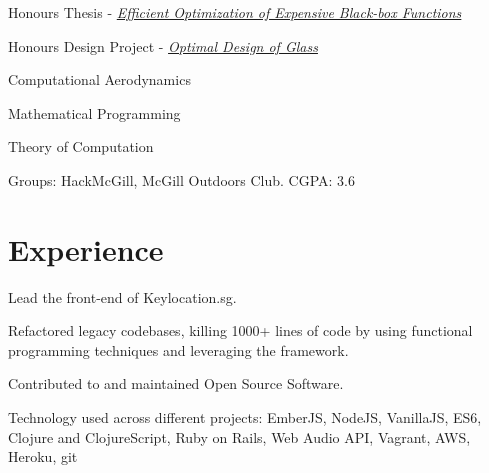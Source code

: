 \documentclass[letterpaper]{deedy-resume} %
\begin{document}
\begin{tightitemize}
\item Honours Thesis - \href{https://dl.dropboxusercontent.com/u/14503566/thesis.pdf}{\textit{Efficient Optimization of Expensive Black-box Functions}}

\item Honours Design Project - \href{https://dl.dropboxusercontent.com/u/14503566/thesis.pdf}{\textit{Optimal
Design of Glass}}
\end{tightitemize}

\insectionspace
{}
\begin{tightitemize}
\item Computational Aerodynamics
\item Mathematical Programming
\item Theory of Computation

\end{tightitemize}
\insectionspace

Groups: HackMcGill, McGill Outdoors Club. CGPA: 3.6

\sectionspace %


\section{Experience}


\begin{tightitemize}
    \item Lead the front-end of Keylocation.sg.
    \item Refactored legacy codebases, killing 1000+ lines of code by using functional programming techniques and leveraging the framework.
    \item Contributed to and maintained Open Source Software.
    \item Technology used across different projects: EmberJS, NodeJS, VanillaJS, ES6, Clojure and ClojureScript, Ruby on Rails, Web Audio API, Vagrant, AWS, Heroku, git
\end{tightitemize}
\end{document}
